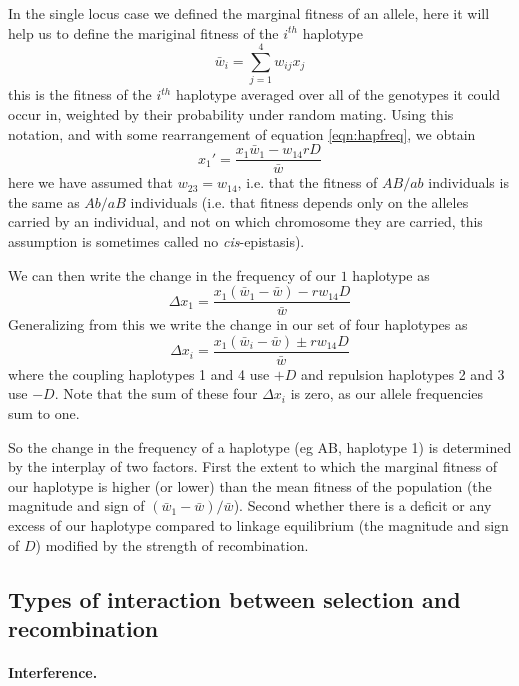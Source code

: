 In the single locus case we defined the marginal fitness of an allele, here it will help us to define the mariginal fitness of the $i^{th}$ haplotype
\begin{equation}
\bar{w}_i = \sum_{j=1}^4 w_{ij} x_j
\end{equation}
this is the fitness of the $i^{th}$ haplotype averaged over all of the genotypes it could occur in, weighted by their probability under random mating. Using this notation, and with some rearrangement of equation \eqref{eqn:hapfreq}, we obtain
\begin{equation}
x_1' = \frac{x_1\bar{w}_1 - w_{14} r D}{\bar{w}}
\end{equation}
here we have assumed that $w_{23}=w_{14}$, i.e. that the fitness of $AB/ab$ individuals is the same as $Ab/aB$ individuals (i.e. that fitness depends only on the alleles carried by an individual, and not on which chromosome they are carried, this assumption is sometimes called no {\it cis}-epistasis). 

We can then write the change in the frequency of our $1$ haplotype as 
\begin{equation}
\Delta x_1= \frac{x_1(\bar{w}_1-\bar{w}) -r w_{14} D}{\bar{w}}
\end{equation}
Generalizing from this we write the change in our set of four haplotypes as
\begin{equation}
\Delta x_i= \frac{x_1(\bar{w}_i-\bar{w}) \pm r w_{14} D}{\bar{w}}
\end{equation}
where the coupling haplotypes 1 and 4 use $+D$ and repulsion haplotypes 2 and 3 use $-D$. Note that the sum of these four $\Delta x_i$ is zero, as our allele frequencies sum to one.

So the change in the frequency of a haplotype (eg AB, haplotype 1) is determined by the interplay of two factors. First the extent to which  the marginal fitness of our haplotype is higher (or lower) than the mean fitness of the population (the magnitude and sign of $(\bar{w}_1-\bar{w})/\bar{w}$). Second whether there is a deficit or any excess of our haplotype compared to linkage equilibrium (the magnitude and sign of $D$) modified by the strength of recombination. 

\subsection{Types of interaction between selection and recombination}

\paragraph{Interference.}

